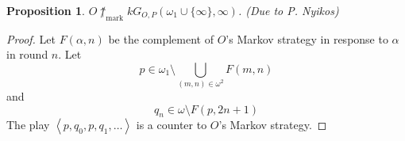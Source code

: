 \documentclass[11pt]{article}
\theoremstyle{plain}
\newtheorem{theorem}{Theorem}
\newtheorem{proposition}[theorem]{Proposition}
\theoremstyle{definition}
\theoremstyle{remark}
\newcommand{\markwin}{\uparrow_{\text{mark}}}
\begin{document}

\begin{proposition}
$O \not\markwin{k} G_{O,P}(\omega_1\cup\{\infty\},\infty)$. (Due to P. Nyikos)
\end{proposition}

\begin{proof}
Let $F(\alpha,n)$ be the complement of $O$'s Markov strategy in response to $\alpha$ in round $n$. Let \[ p\in \omega_1 \setminus \bigcup_{(m,n)\in\omega^2} F(m,n)\] and \[q_n \in \omega \setminus F(p,2n+1)\] The play $\left<p,q_0,p,q_1,\dots\right>$ is a counter to $O$'s Markov strategy.
\end{proof}

%
%
%
%
\end{document}
